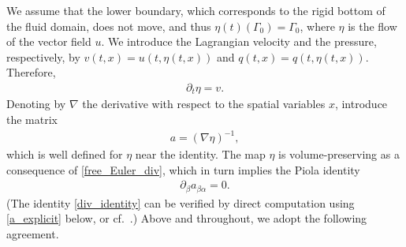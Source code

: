 \documentclass[10pt,reqno]{amsart}
\theoremstyle{plain}
\theoremstyle{definition}
\numberwithin{equation}{section}
\newcommand{\al}{\alpha}
\newcommand{\be}{\beta}
\newcommand{\Ga}{\Gamma}
\begin{document}
We assume that the lower boundary,
which corresponds to the rigid bottom of the fluid domain,
does not move, and thus $\eta(t)(\Ga_0) = \Ga_0$,
where $\eta$ is the flow of the vector field $u$.
We introduce
the Lagrangian velocity and the pressure, respectively,
by $v(t,x) = u(t,\eta(t,x))$ and $q(t,x) = q(t,\eta(t,x))$.
Therefore,
\begin{gather}
\partial_t \eta = v.
\label{eta_dot}
\end{gather}
Denoting by $\nabla$ the derivative
with respect to the spatial variables $x$, introduce the matrix
\begin{gather}
a = ( \nabla \eta )^{-1},
\nonumber
\end{gather}
which is well defined for $\eta$ near the identity. The map $\eta$ is volume-preserving
as a consequence of \eqref{free_Euler_div}, which in turn implies the Piola identity
\begin{gather}
\partial_\be a_{\be\al} = 0.
\label{div_identity}
\end{gather}
(The identity \eqref{div_identity} can be verified by direct computation using
\eqref{a_explicit} below, or cf.~\cite[p.~462]{EvansPDE}.)
Above and throughout, we adopt the following agreement.
\end{document}
